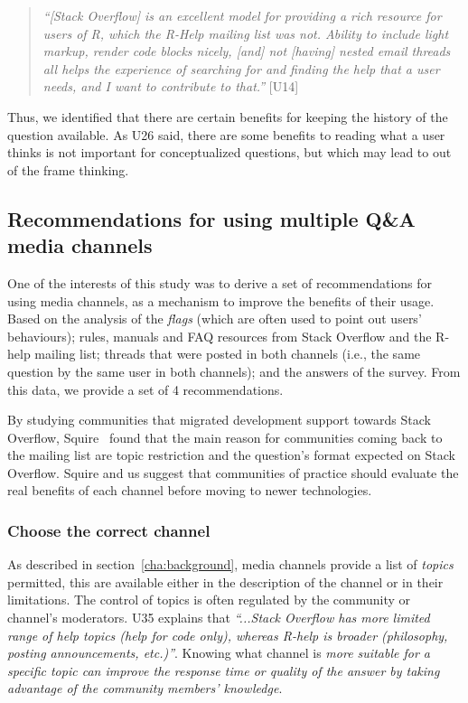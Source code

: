     \begin{quote}
        \textit{``[Stack Overflow] is an excellent model for providing a rich resource for users of R, which the R-Help mailing list was not. 
        Ability to include light markup, render code blocks nicely, [and] not [having] nested email threads all helps the experience of searching for and finding the help that a user needs, and I want to contribute to that.''} [U14]
    \end{quote}

Thus, we identified that there are certain benefits for keeping the history of the question available.
As U26 said, there are some benefits to reading what a user thinks is not important for conceptualized questions, but which may lead to out of the frame thinking. 


\subsection{Recommendations for using multiple Q\&A media channels}

    One of the interests of this study was to derive a set of recommendations for using media channels, as a mechanism to improve the benefits of their usage.
    Based on the analysis of the \textit{flags} (which are often used to point out users' behaviours); rules, manuals and FAQ resources from Stack Overflow and the R-help mailing list; threads that were posted in both channels (i.e., the same question by the same user in both channels); and the answers of the survey.
    From this data, we provide a set of 4 recommendations.

By studying communities that migrated development support towards Stack Overflow, Squire~\cite{Squire2015a} found that the main reason for communities coming back to the mailing list are topic restriction and the question's format expected on Stack Overflow.
Squire and us suggest that communities of practice should evaluate the real benefits of each channel before moving to newer technologies.


    \subsubsection{Choose the correct channel}

        As described in section~\ref{cha:background}, media channels provide a list of \textit{topics} permitted, this are available either in the description of the channel or in their limitations.
        The control of topics is often regulated by the community or channel's moderators.
        U35 explains that \textit{``...Stack Overflow has more limited range of help topics (help for code only), whereas R-help is broader (philosophy, posting announcements, etc.)''}.
        Knowing what channel is \emph{more suitable for a specific topic can improve the response time or quality of the answer by taking advantage of the community members' knowledge}.

